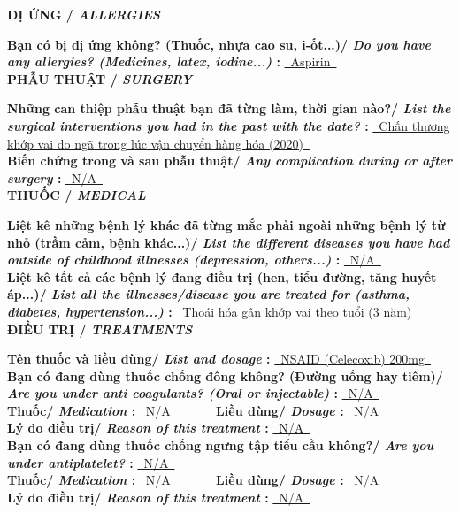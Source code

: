 \documentclass[11pt,a4paper]{article}
\newcommand{\SubSectionTitle}[2]{%
    \vspace{0.08cm}
    {\bfseries #1/ \textit{#2}}\par
}
\begin{document}
\SubSectionTitle{ DỊ ỨNG }{ ALLERGIES }

\textbf{ Bạn có bị dị ứng không? (Thuốc, nhựa cao su, i-ốt...)/ \textit{ Do you have any allergies? (Medicines, latex, iodine...) }: } \underline{~Aspirin~}\\[0.12cm]

\SubSectionTitle{ PHẪU THUẬT }{ SURGERY }

\textbf{ Những can thiệp phẫu thuật bạn đã từng làm, thời gian nào?/ \textit{ List the surgical interventions you had in the past with the date? }: } \underline{~Chấn thương khớp vai do ngã trong lúc vận chuyển hàng hóa (2020)~}\\[0.12cm]
\textbf{ Biến chứng trong và sau phẫu thuật/ \textit{ Any complication during or after surgery }: } \underline{~N/A~}\\[0.12cm]

\SubSectionTitle{ THUỐC }{ MEDICAL }

\textbf{ Liệt kê những bệnh lý khác đã từng mắc phải ngoài những bệnh lý từ nhỏ (trầm cảm, bệnh khác...)/ \textit{ List the different diseases you have had outside of childhood illnesses (depression, others...) }: } \underline{~N/A~}\\[0.12cm]
\textbf{ Liệt kê tất cả các bệnh lý đang điều trị (hen, tiểu đường, tăng huyết áp...)/ \textit{ List all the illnesses/disease you are treated for (asthma, diabetes, hypertension...) }: } \underline{~Thoái hóa gân khớp vai theo tuổi (3 năm)~}\\[0.12cm]

\SubSectionTitle{ ĐIỀU TRỊ }{ TREATMENTS }

\textbf{ Tên thuốc và liều dùng/ \textit{ List and dosage }: } \underline{~NSAID (Celecoxib) 200mg~}\\[0.12cm]
\textbf{ Bạn có đang dùng thuốc chống đông không? (Đường uống hay tiêm)/ \textit{ Are you under anti coagulants? (Oral or injectable) }: } \underline{~N/A~}\\[0.12cm]
\textbf{ Thuốc/ \textit{ Medication }: } \underline{~N/A~} ~~~~~ \textbf{ Liều dùng/ \textit{ Dosage }: } \underline{~N/A~}\\[0.12cm]
\textbf{ Lý do điều trị/ \textit{ Reason of this treatment }: } \underline{~N/A~}\\[0.12cm]
\textbf{ Bạn có đang dùng thuốc chống ngưng tập tiểu cầu không?/ \textit{ Are you under antiplatelet? }: } \underline{~N/A~}\\[0.12cm]
\textbf{ Thuốc/ \textit{ Medication }: } \underline{~N/A~} ~~~~~ \textbf{ Liều dùng/ \textit{ Dosage }: } \underline{~N/A~}\\[0.12cm]
\textbf{ Lý do điều trị/ \textit{ Reason of this treatment }: } \underline{~N/A~}\\[0.12cm]
\end{document}
